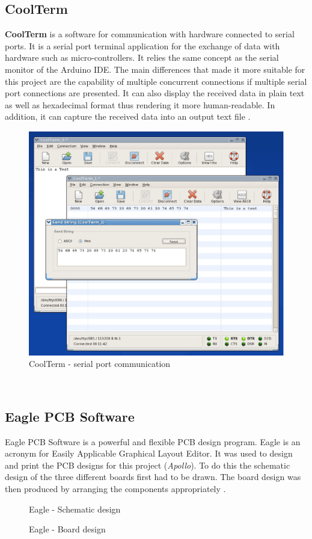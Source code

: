 \documentclass[12pt,a4paper,draft]{report}
\begin{document}
\subsection{CoolTerm}
\textbf{CoolTerm} is a software for communication with hardware connected to serial ports.
It is a serial port terminal application for the exchange of data with hardware such as micro-controllers.
It relies the same concept as the serial monitor of the Arduino IDE.
The main differences that made it more suitable for this project are the capability of multiple concurrent connections if multiple serial port connections are presented.
It can also display the received data in plain text as well as hexadecimal format thus rendering it more human-readable.
In addition, it can capture the received data into an output text file \cite{website:coolterm}.
\begin{figure}[H]
\centering
    \includegraphics*[scale=0.3]{cooltermtinux}
    \caption{CoolTerm - serial port communication}
\end{figure}
\ \\
%
\subsection{Eagle PCB Software}
Eagle PCB Software is a powerful and flexible PCB design program. Eagle is an acronym for Easily Applicable Graphical Layout Editor. It was used to design and print the PCB designs for this project (\emph{Apollo}). To do this the schematic design of the three different boards first had to be drawn. The board design was then produced by arranging the components appropriately \cite{website:eagle}.
\begin{figure}[H]
\centering
    \caption{Eagle - Schematic design}

    \caption{Eagle - Board design}
\end{figure}
\ \\
\end{document}

